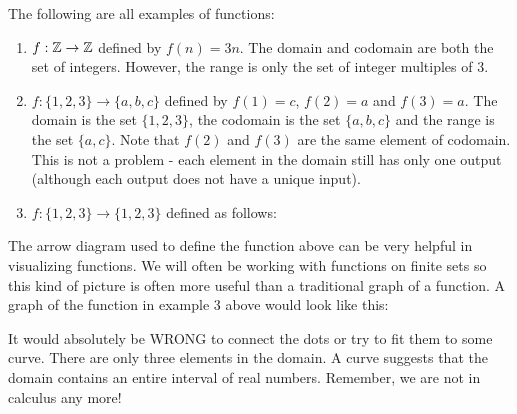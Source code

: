 \documentclass[12pt]{article}
\begin{document}
\begin{example}
  The following are all examples of functions:
  \begin{enumerate}
    \item $f:\mathbb Z \to \mathbb Z$ defined by $f(n) = 3n$.  The domain and codomain are both the set of integers.  However, the range is only the set of integer multiples of 3.
    \item $f: \{1,2,3\} \to \{a,b,c\}$ defined by $f(1) = c$, $f(2) = a$ and $f(3) = a$.  The domain is the set $\{1,2,3\}$, the codomain is the set $\{a,b,c\}$ and the range is the set $\{a,c\}$.  Note that $f(2)$ and $f(3)$ are the same element of codomain.  This is not a problem - each element in the domain still has only one output (although each output does not have a unique input).
    \item $f:\{1,2,3\} \to \{1,2,3\}$ defined as follows:
    \begin{center}

    \end{center}

  \end{enumerate}

\end{example}

The arrow diagram used to define the function above can be very helpful in visualizing functions.  We will often be working with functions on finite sets so this kind of picture is often more useful than a traditional graph of a function.  A graph of the function in example 3 above would look like this:

\begin{center}

\end{center}

It would absolutely be WRONG to connect the dots or try to fit them to some curve.  There are only three elements in the domain.  A curve suggests that the domain contains an entire interval of real numbers.  Remember, we are not in calculus any more!
\end{document}
